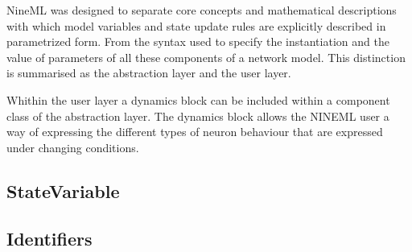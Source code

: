 \documentclass[draftspec]{ninemlspec}
\begin{document}
NineML was designed to separate core concepts and mathematical descriptions with which model variables and state update rules are explicitly described in parametrized form.  From the syntax used to specify the instantiation and the value of parameters of all these components of a network model. This distinction is summarised as the abstraction layer and the user layer.

Whithin the user layer a dynamics block can be included within a component class of the abstraction layer. The dynamics block allows the NINEML user a way of expressing the different types of neuron behaviour that are expressed under changing conditions.


\subsection{StateVariable}

\subsection{Identifiers}
\label{sec:identifier}
\clearpage


\end{document}
